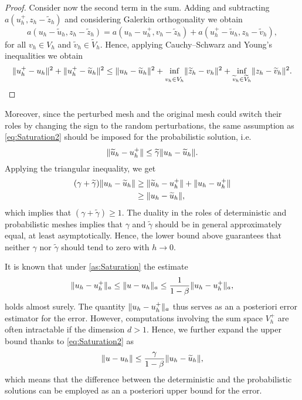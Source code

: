 \begin{proof}
	Consider now the second term in the sum. Adding and subtracting $a(u_h^+, z_h - \tilde z_h)$ and considering Galerkin orthogonality we obtain
	\begin{equation}
		a(u_h - \widetilde u_h, z_h - \tilde z_h) = a(u_h - u_h^+, v_h - \tilde z_h) + a(u_h^+ - \widetilde u_h, z_h - \widetilde v_h),
	\end{equation} 
	for all $v_h \in V_h$ and $\widetilde v_h \in \widetilde V_h$. Hence, applying Cauchy--Schwarz and Young's inequalities we obtain
	\begin{equation}
		\lVert u_h^+ - u_h\rVert^2 + \lVert u_h^+ - \widetilde u_h\rVert^2 \leq \lVert u_h - \widetilde u_h\rVert^2 + \inf_{\vphantom{\widetilde v_h \in \widetilde V_h}v_h \in V_h} \lVert\widetilde z_h - v_h\rVert^2 + \inf_{\widetilde v_h \in \widetilde V_h} \lVert z_h - \widetilde v_h\rVert^2.
	\end{equation} 
\end{proof}

Moreover, since the perturbed mesh and the original mesh could switch their roles by changing the sign to the random perturbations, the same assumption as \eqref{eq:Saturation2} should be imposed for the probabilistic solution, i.e.
\begin{equation}
	\lVert\widetilde u_h - u_h^+\rVert \leq \widetilde \gamma \lVert u_h - \widetilde u_h\rVert.
\end{equation}
Applying the triangular inequality, we get
\begin{equation}
\begin{aligned}
	(\gamma + \widetilde \gamma) \lVert u_h - \widetilde u_h\rVert &\geq \lVert\widetilde u_h - u_h^+\rVert + \lVert u_h - u_h^+\rVert \\
	& \geq \lVert u_h - \widetilde u_h\rVert,
\end{aligned}
\end{equation}
which implies that $(\gamma + \widetilde \gamma) \geq 1$. The duality in the roles of deterministic and probabilistic meshes implies that $\gamma$ and $\widetilde \gamma$ should be in general approximately equal, at least asymptotically. Hence, the lower bound above guarantees that neither $\gamma$ nor $\widetilde \gamma$ should tend to zero with $h\to 0$.

It is known \cite{BaK93} that under \cref{as:Saturation} the estimate
\begin{equation}
	\lVert u_h - u_h^+\rVert_a \leq \lVert u - u_h\rVert_a \leq \frac{1}{1 - \beta} \lVert u_h - u_h^+\rVert_a,
\end{equation}
holds almost surely. The quantity $\lVert u_h - u_h^+\rVert_a$ thus serves as an a posteriori error estimator for the error. However, computations involving the sum space $V_h^+$ are often intractable if the dimension $d > 1$. Hence, we further expand the upper bound thanks to \eqref{eq:Saturation2} as
\begin{equation}\label{eq:ErrorEstimateFinal}
	\lVert u - u_h\rVert \leq \frac{\gamma}{1 - \beta} \lVert u_h - \widetilde u_h\rVert,
\end{equation}
which means that the difference between the deterministic and the probabilistic solutions can be employed as an a posteriori upper bound for the error.

